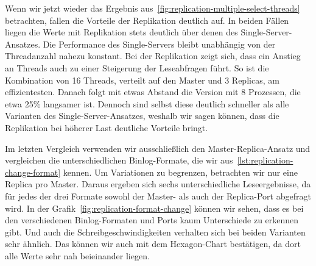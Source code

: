Wenn wir jetzt wieder das Ergebnis aus~\ref{fig:replication-multiple-select-threads} betrachten, fallen die Vorteile der Replikation deutlich auf.
In beiden Fällen liegen die Werte mit Replikation stets deutlich über denen des Single-Server-Ansatzes.
Die Performance des Single-Servers bleibt unabhängig von der Threadanzahl nahezu konstant.
Bei der Replikation zeigt sich, dass ein Anstieg an Threads auch zu einer Steigerung der Leseabfragen führt.
So ist die Kombination von 16 Threads, verteilt auf den Master und 3 Replicas, am effizientesten.
Danach folgt mit etwas Abstand die Version mit 8 Prozessen, die etwa 25\% langsamer ist.
Dennoch sind selbst diese deutlich schneller als alle Varianten des Single-Server-Ansatzes, weshalb wir sagen können, dass die Replikation bei höherer Last deutliche Vorteile bringt.

Im letzten Vergleich verwenden wir ausschließlich den Master-Replica-Ansatz und vergleichen die unterschiedlichen Binlog-Formate, die wir aus~\ref{lst:replication-change-format} kennen.
Um Variationen zu begrenzen, betrachten wir nur eine Replica pro Master.
Daraus ergeben sich sechs unterschiedliche Leseergebnisse, da für jedes der drei Formate sowohl der Master- als auch der Replica-Port abgefragt wird.
In der Grafik~\ref{fig:replication-format-change} können wir sehen, dass es bei den verschiedenen Binlog-Formaten und Ports kaum Unterschiede zu erkennen gibt.
Und auch die Schreibgeschwindigkeiten verhalten sich bei beiden Varianten sehr ähnlich.
Das können wir auch mit dem Hexagon-Chart bestätigen, da dort alle Werte sehr nah beieinander liegen.

